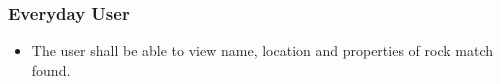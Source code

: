\documentclass[titlepage]{article}
\begin{document}
    \subsubsection{Everyday User}
  \begin{itemize}
  \item The user shall be able to view name, location and properties of rock match found. 
\end{itemize}
\end{document}
